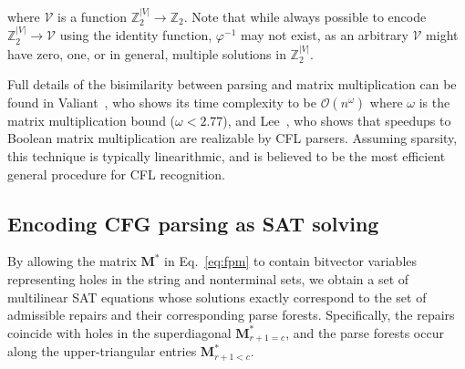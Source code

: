\documentclass[sigplan,review,anonymous,acmsmall]{acmart}\settopmatter{printfolios=false,printccs=false,printacmref=false}
\begin{document}
    \noindent where $\mathcal{V}$ is a function $\mathbb{Z}_2^{|V|}\rightarrow\mathbb{Z}_2$. Note that while always possible to encode $\mathbb{Z}_2^{|V|} \rightarrow \mathcal{V}$ using the identity function, $\varphi^{-1}$ may not exist, as an arbitrary $\mathcal{V}$ might have zero, one, or in general, multiple solutions in $\mathbb{Z}_2^{|V|}$.

    \noindent Full details of the bisimilarity between parsing and matrix multiplication can be found in Valiant~\cite{valiant1975general}, who shows its time complexity to be $\mathcal{O}(n^\omega)$ where $\omega$ is the matrix multiplication bound ($\omega < 2.77$), and Lee~\cite{lee2002fast}, who shows that speedups to Boolean matrix multiplication are realizable by CFL parsers. Assuming sparsity, this technique is typically linearithmic, and is believed to be the most efficient general procedure for CFL recognition.



    \subsection{Encoding CFG parsing as SAT solving}\label{sec:sat}

    By allowing the matrix $\mathbf{M}^*$ in Eq.~\ref{eq:fpm} to contain bitvector variables representing holes in the string and nonterminal sets, we obtain a set of multilinear SAT equations whose solutions exactly correspond to the set of admissible repairs and their corresponding parse forests. Specifically, the repairs coincide with holes in the superdiagonal $\mathbf{M}^*_{r+1 = c}$, and the parse forests occur along the upper-triangular entries $\mathbf{M}^*_{r + 1 < c}$.


%
\end{document}
